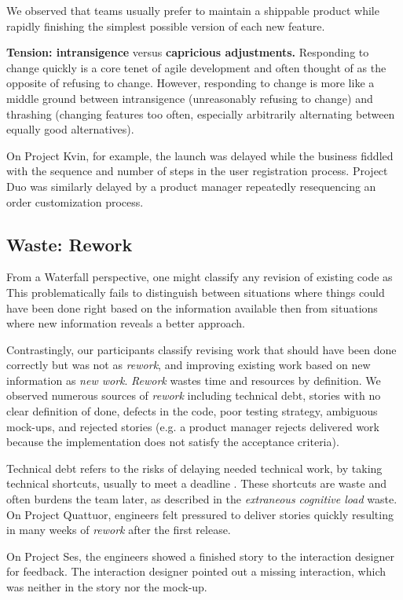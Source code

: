 We observed that teams usually prefer to maintain a shippable product while rapidly finishing the simplest possible version of each new feature.

\textbf{Tension: intransigence} versus \textbf{capricious adjustments.}
Responding to change quickly is a core tenet of agile development and often thought of as the opposite of refusing to change. However, responding to change is more like a middle ground between intransigence (unreasonably refusing to change) and thrashing (changing features too often, especially arbitrarily alternating between equally good alternatives). 

On Project Kvin, for example, the launch was delayed while the business fiddled with the sequence and number of steps in the user registration process. Project Duo was similarly delayed by a product manager repeatedly resequencing an order customization process. 
\subsection{Waste: Rework}
From a Waterfall perspective, one might classify any revision of existing code as  This problematically fails to distinguish between situations where things could have been done right based on the information available then from situations where new information reveals a better approach. 

Contrastingly, our participants classify revising work that should have been done correctly but was not as \textit{rework}, and improving existing work based on new information as \textit{new work}. \textit{Rework} wastes time and resources by definition. We observed numerous sources of \textit{rework} including technical debt, stories with no clear definition of done, defects in the code, poor testing strategy, ambiguous mock-ups, and rejected stories (e.g. a product manager rejects delivered work because the implementation does not satisfy the acceptance criteria).
 
Technical debt refers to the risks of delaying needed technical work, by taking technical shortcuts, usually to meet a deadline \cite{McConnellTechnicalDebt}. These shortcuts are waste and often burdens the team later, as described in the \textit{extraneous cognitive load} waste. On Project Quattuor, engineers felt pressured to deliver stories quickly resulting in many weeks of \textit{rework} after the first release.

On Project Ses, the engineers showed a finished story to the interaction designer for feedback. The interaction designer pointed out a missing interaction, which was neither in the story nor the mock-up.

